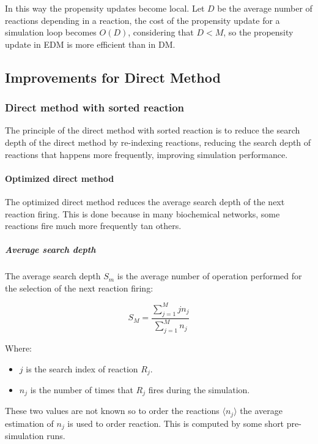     

    In this way the propensity updates become local.
    Let $D$ be the average number of reactions depending in a reaction, the cost of the propensity update for a simulation loop becomes $O(D)$, considering that $D<M$, so the propensity update in EDM is more efficient than in DM.

  \subsection{Improvements for Direct Method}

    \subsubsection{Direct method with sorted reaction}
    The principle of the direct method with sorted reaction is to reduce the search depth of the direct method by re-indexing reactions, reducing the search depth of reactions that happens more frequently, improving simulation performance.

      \paragraph{Optimized direct method}
      The optimized direct method reduces the average search depth of the next reaction firing.
      This is done because in many biochemical networks, some reactions fire much more frequently tan others.

        \subparagraph{Average search depth}
        The average search depth $S_m$ is the average number of operation performed for the selection of the next reaction firing:

        $$S_M = \frac{\sum\limits_{j=1}^Mjn_j}{\sum\limits_{j=1}^Mn_j}$$

        Where:

        \begin{multicols}{2}
          \begin{itemize}
            \item $j$ is the search index of reaction $R_j$.
            \item $n_j$ is the number of times that $R_j$ fires during the simulation.
          \end{itemize}
        \end{multicols}

        These two values are not known so to order the reactions $\langle n_j\rangle$ the average estimation of $n_j$ is used to order reaction.
        This is computed by some short pre-simulation runs.


